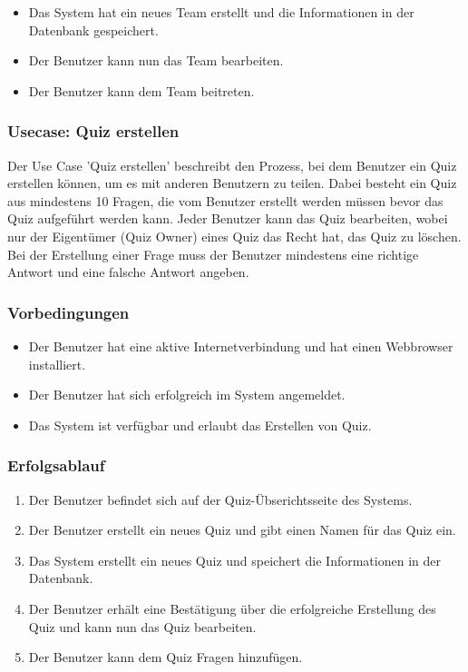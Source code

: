 \begin{itemize}
  \item Das System hat ein neues Team erstellt und die Informationen in der Datenbank gespeichert.
  \item Der Benutzer kann nun das Team bearbeiten.
  \item Der Benutzer kann dem Team beitreten.
\end{itemize}

\subsubsection{Usecase: Quiz erstellen}

Der Use Case 'Quiz erstellen' beschreibt den Prozess, bei dem Benutzer ein Quiz erstellen können, um es mit anderen Benutzern zu teilen. 
Dabei besteht ein Quiz aus mindestens 10 Fragen, die vom Benutzer erstellt werden müssen bevor das Quiz aufgeführt werden kann. 
Jeder Benutzer kann das Quiz bearbeiten, wobei nur der Eigentümer (Quiz Owner) eines Quiz das Recht hat, das Quiz zu löschen.
Bei der Erstellung einer Frage muss der Benutzer mindestens eine richtige Antwort und eine falsche Antwort angeben.

\subsubsection*{Vorbedingungen}

\begin{itemize}
  \item Der Benutzer hat eine aktive Internetverbindung und hat einen Webbrowser installiert.
  \item Der Benutzer hat sich erfolgreich im System angemeldet.
  \item Das System ist verfügbar und erlaubt das Erstellen von Quiz.
\end{itemize}

\subsubsection*{Erfolgsablauf}

\begin{enumerate}
  \item Der Benutzer befindet sich auf der Quiz-Übserichtsseite des Systems.
  \item Der Benutzer erstellt ein neues Quiz und gibt einen Namen für das Quiz ein.
  \item Das System erstellt ein neues Quiz und speichert die Informationen in der Datenbank.
  \item Der Benutzer erhält eine Bestätigung über die erfolgreiche Erstellung des Quiz und kann nun das Quiz bearbeiten.
  \item Der Benutzer kann dem Quiz Fragen hinzufügen.
\end{enumerate}

